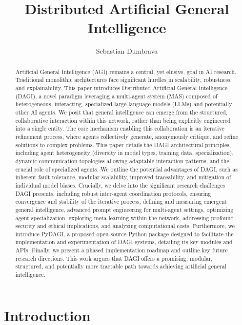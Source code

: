 \documentclass[12pt]{amsart}
\title{Distributed Artificial General Intelligence} %
\author{Sebastian Dumbrava}
\begin{document}
\maketitle

\begin{abstract}
Artificial General Intelligence (AGI) remains a central, yet elusive, goal in AI research. Traditional monolithic architectures face significant hurdles in scalability, robustness, and explainability. This paper introduces Distributed Artificial General Intelligence (DAGI), a novel paradigm leveraging a multi-agent system (MAS) composed of heterogeneous, interacting, specialized large language models (LLMs) and potentially other AI agents. We posit that general intelligence can emerge from the structured, collaborative interaction within this network, rather than being explicitly engineered into a single entity. The core mechanism enabling this collaboration is an iterative refinement process, where agents collectively generate, anonymously critique, and refine solutions to complex problems. This paper details the DAGI architectural principles, including agent heterogeneity (diversity in model types, training data, specialization), dynamic communication topologies allowing adaptable interaction patterns, and the crucial role of specialized agents. We outline the potential advantages of DAGI, such as inherent fault tolerance, modular scalability, improved traceability, and mitigation of individual model biases. Crucially, we delve into the significant research challenges DAGI presents, including robust inter-agent coordination protocols, ensuring convergence and stability of the iterative process, defining and measuring emergent general intelligence, advanced prompt engineering for multi-agent settings, optimizing agent specialization, exploring meta-learning within the network, addressing profound security and ethical implications, and analyzing computational costs. Furthermore, we introduce PyDAGI, a proposed open-source Python package designed to facilitate the implementation and experimentation of DAGI systems, detailing its key modules and APIs. Finally, we present a phased implementation roadmap and outline key future research directions. This work argues that DAGI offers a promising, modular, structured, and potentially more tractable path towards achieving artificial general intelligence.
\end{abstract}

\tableofcontents
\newpage

\section{Introduction}
\label{sec:introduction}
\end{document}
